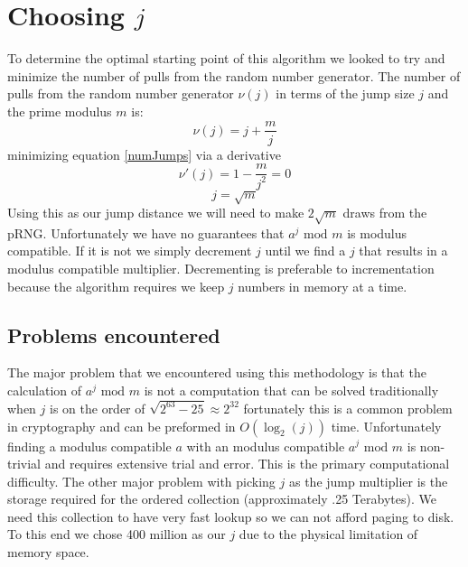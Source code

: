 \documentclass[11pt]{article} %
\begin{document}
\section{Choosing $j$}\label{choosej}
To determine the optimal starting point of this algorithm we looked to try and minimize the number of pulls from the random number generator. The number of pulls from the random number generator $\nu(j)$ in terms of the jump size $j$ and the prime modulus $m$  is: 
\begin{equation}\label{numJumps}
\nu(j) = j + \frac{m}{j}
\end{equation}
minimizing equation \ref{numJumps} via a derivative
$$\nu'(j) = 1-\frac{m}{j^2}=0$$
\begin{equation}
\label{minJumps}
j=\sqrt{m}
\end{equation}
Using this as our jump distance we will need to make $2\sqrt{m}$ draws from the pRNG. Unfortunately we have no guarantees that $a^j \textrm{ mod } m$ is modulus compatible. If it is not we simply decrement $j$ until we find a $j$ that results in a  modulus compatible multiplier. Decrementing is preferable to incrementation because the algorithm requires we keep $j$ numbers in memory at a time.
\subsection{Problems encountered}
The major problem that we encountered using this methodology is that the calculation of $a^j \textrm{ mod } m$ is not a computation that can be solved traditionally when $j$ is on the order of $\sqrt{2^{63}-25}\approx2^{32}$ fortunately this is a common problem in cryptography and can be preformed in $O(\log_2(j))$ time. Unfortunately finding a modulus compatible $a$ with an modulus compatible $a^j \textrm{ mod } m$ is non-trivial and requires extensive trial and error. This is the primary computational difficulty. The other major problem with picking $j$ as the jump multiplier is the storage required for the ordered collection (approximately .25 Terabytes). We need this collection to have very fast lookup so we can not afford paging to disk. To this end  we chose 400 million as our $j$ due to the physical limitation of memory space.
\end{document}
